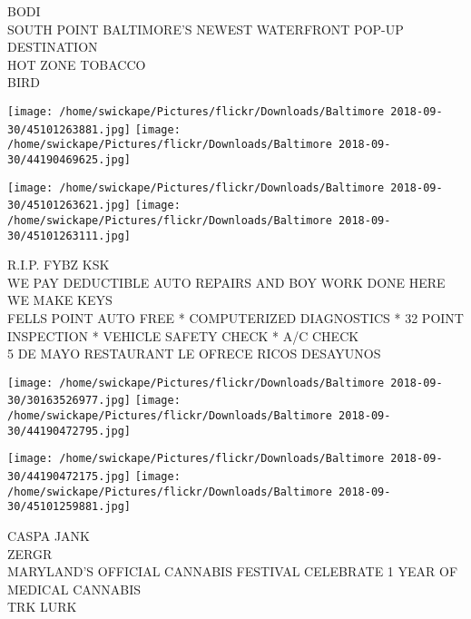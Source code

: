 \documentclass[10pt,letterpaper]{article}
\begin{document}
BODI\\
SOUTH POINT BALTIMORE'S NEWEST WATERFRONT POP{-}UP DESTINATION\\
HOT ZONE TOBACCO\\
BIRD\\
\pagebreak

\texttt{[image: /home/swickape/Pictures/flickr/Downloads/Baltimore 2018-09-30/45101263881.jpg]}
\texttt{[image: /home/swickape/Pictures/flickr/Downloads/Baltimore 2018-09-30/44190469625.jpg]}

\texttt{[image: /home/swickape/Pictures/flickr/Downloads/Baltimore 2018-09-30/45101263621.jpg]}
\texttt{[image: /home/swickape/Pictures/flickr/Downloads/Baltimore 2018-09-30/45101263111.jpg]}

R.I.P. FYBZ KSK\\
WE PAY DEDUCTIBLE AUTO REPAIRS AND BOY WORK DONE HERE WE MAKE KEYS\\
FELLS POINT AUTO FREE * COMPUTERIZED DIAGNOSTICS * 32 POINT INSPECTION * VEHICLE SAFETY CHECK * A/C CHECK\\
5 DE MAYO RESTAURANT LE OFRECE RICOS DESAYUNOS\\
\pagebreak

\texttt{[image: /home/swickape/Pictures/flickr/Downloads/Baltimore 2018-09-30/30163526977.jpg]}
\texttt{[image: /home/swickape/Pictures/flickr/Downloads/Baltimore 2018-09-30/44190472795.jpg]}

\texttt{[image: /home/swickape/Pictures/flickr/Downloads/Baltimore 2018-09-30/44190472175.jpg]}
\texttt{[image: /home/swickape/Pictures/flickr/Downloads/Baltimore 2018-09-30/45101259881.jpg]}

CASPA JANK\\
ZERGR\\
MARYLAND'S OFFICIAL CANNABIS FESTIVAL CELEBRATE 1 YEAR OF MEDICAL CANNABIS\\
TRK LURK\\
\pagebreak
\end{document}
